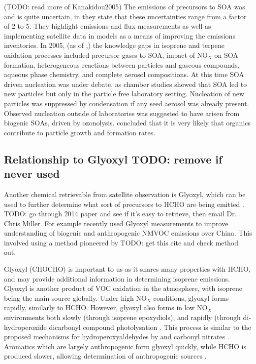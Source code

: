     (TODO: read more of Kanakidou2005)
    The emissions of precursors to SOA was and is quite uncertain, in \cite{Kanakidou2005} they state that these uncertainties range from a factor of 2 to 5.
    They highlight emissions and flux measurements as well as implementing satellite data in models as a means of improving the emissions inventories.
    In 2005, (as of \cite{Kanakidou2005},) the knowledge gaps in isoprene and terpene oxidation processes included precursor gases to SOA, impact of NO$_X$ on SOA formation, heterogeneous reactions between particles and gaseous compounds, aqueous phase chemistry, and complete aerosol compositions.
    At this time SOA driven nucleation was under debate, as chamber studies showed that SOA led to new particles but only in the particle free laboratory setting. 
    Nucleation of new particles was suppressed by condensation if any seed aerosol was already present.
    Observed nucleation outside of laboratories was suggested to have arisen from biogenic SOAs, driven by ozonolysis.
    \cite{Kanakidou2005} concluded that it is very likely that organics contribute to particle growth and formation rates.
    
    
  \subsection{Relationship to Glyoxyl TODO: remove if never used}
    
    Another chemical retrievable from satellite observation is Glyoxyl, which can be used to further determine what sort of precursors to HCHO are being emitted \citep{Stavrakou2009, Miller2014, Miller2017}.
    TODO: go through 2014 paper and see if it's easy to retrieve, then email Dr. Chris Miller.
    For example \cite{Cao2018_discuss} recently used Glyoxyl measurements to improve understanding of biogenic and anthropogenic NMVOC emissions over China.
    This involved using a method pioneered by \cite{Stavrakou2009} TODO: get this cite and check method out.
    
    Glyoxyl (CHOCHO) is important to us as it shares many properties with HCHO, and may provide additional information in determining isoprene emissions.
    Glyoxyl is another product of VOC oxidation in the atmosphere, with isoprene being the main source globally.
    Under high NO$_X$ conditions, glyoxyl forms rapidly, similarly to HCHO.
    However, glyoxyl also forms in low NO$_X$ environments both slowly (through isoprene epoxydiols), and rapidly (through di-hydroperoxide dicarbonyl compound photolysation \citep{Crounse2013}.
    This process is similar to the proposed mechanisms for hydroperoxyaldehydes by \cite{Peeters2014} and carbonyl nitrates \citep{Muller2014}.
    Aromatics which are largely anthropogenic form glyoxyl quickly, while HCHO is produced slower, allowing determination of anthropogenic sources \citep{Cao2018_discuss}.
    
